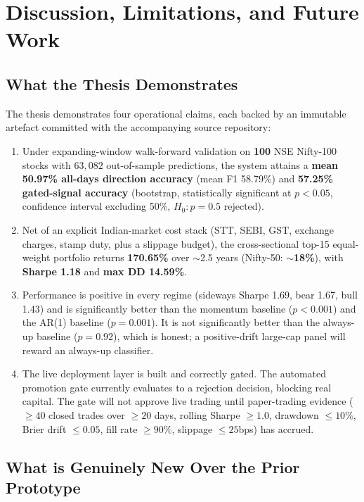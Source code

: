 \chapter{Discussion, Limitations, and Future Work} \label{chapter6}

\section{What the Thesis Demonstrates}

The thesis demonstrates four operational claims, each backed by an immutable artefact committed with the accompanying source repository:

\begin{enumerate}
    \item Under expanding-window walk-forward validation on \textbf{100} NSE Nifty-100 stocks with \(63{,}082\) out-of-sample predictions, the system attains a \textbf{mean 50.97\% all-days direction accuracy} (mean F1 58.79\%) and \textbf{57.25\% gated-signal accuracy} (bootstrap, statistically significant at $p<0.05$, confidence interval excluding 50\%, $H_0\!: p=0.5$ rejected).
    \item Net of an explicit Indian-market cost stack (STT, SEBI, GST, exchange charges, stamp duty, plus a slippage budget), the cross-sectional top-15 equal-weight portfolio returns \textbf{170.65\%} over $\sim$2.5 years (Nifty-50: $\sim$\textbf{18\%}), with \textbf{Sharpe 1.18} and \textbf{max DD 14.59\%}.
    \item Performance is positive in every regime (sideways Sharpe 1.69, bear 1.67, bull 1.43) and is significantly better than the momentum baseline (\(p<0.001\)) and the AR(1) baseline (\(p=0.001\)). It is not significantly better than the always-up baseline (\(p=0.92\)), which is honest; a positive-drift large-cap panel will reward an always-up classifier.
    \item The live deployment layer is built and correctly gated. The automated promotion gate currently evaluates to a rejection decision, blocking real capital. The gate will not approve live trading until paper-trading evidence (\(\geq 40\) closed trades over \(\geq 20\) days, rolling Sharpe \(\geq 1.0\), drawdown \(\leq 10\%\), Brier drift \(\leq 0.05\), fill rate \(\geq 90\%\), slippage \(\leq 25\)bps) has accrued.
\end{enumerate}

\section{What is Genuinely New Over the Prior Prototype}

